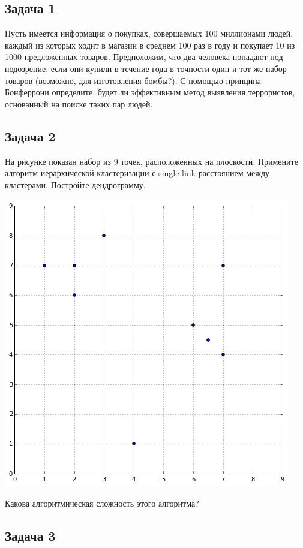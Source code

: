 \documentclass[12pt,a4paper]{article}
\author{Николай Анохин}
\begin{document}
\subsection*{Задача 1}

Пусть имеется информация о покупках, совершаемых 100 миллионами людей, каждый из которых ходит в магазин в среднем 100 раз в году и покупает 10 из 1000 предложенных товаров. Предположим, что два человека попадают под подозрение, если они купили в течение года в точности один и тот же набор товаров (возможно, для изготовления бомбы?). С помощью принципа Бонферрони определите, будет ли эффективным метод выявления террористов, основанный на поиске таких пар людей.

\subsection*{Задача 2}

На рисунке показан набор из $9$ точек, расположенных на плоскости. Примените алгоритм иерархической кластеризации с single-link расстоянием между кластерами. Постройте дендрограмму.
\begin{center}
\includegraphics[scale=0.5]{2.png}
\end{center}
Какова алгоритмическая сложность этого алгоритма?

\subsection*{Задача 3}
\end{document}
